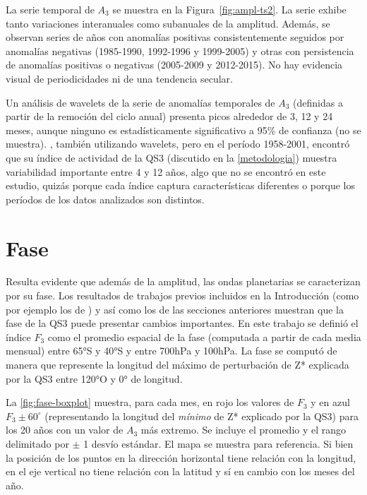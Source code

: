 \documentclass[spanish,a4paper,12pt,oneside]{book}
\begin{document}
La serie temporal de \(A_3\) se muestra en la Figura~\ref{fig:ampl-ts2}.
La serie exhibe tanto variaciones interanuales como subanuales de la
amplitud. Además, se observan series de años con anomalías positivas
consistentemente seguidos por anomalías negativas (1985-1990, 1992-1996
y 1999-2005) y otras con persistencia de anomalías positivas o negativas
(2005-2009 y 2012-2015). No hay evidencia visual de periodicidades ni de
una tendencia secular.

Un análisis de wavelets de la serie de anomalías temporales de \(A_3\)
(definidas a partir de la remoción del ciclo anual) presenta picos
alrededor de 3, 12 y 24 meses, aunque ninguno es estadísticamente
significativo a 95\% de confianza (no se muestra). \citet{Raphael2004},
también utilizando wavelets, pero en el período 1958-2001, encontró que
su índice de actividad de la QS3 (discutido en la \autoref{metodologia})
muestra variabilidad importante entre 4 y 12 años, algo que no se
encontró en este estudio, quizás porque cada índice captura
características diferentes o porque los períodos de los datos analizados
son distintos.

\section{Fase}\label{fase}

Resulta evidente que además de la amplitud, las ondas planetarias se
caracterizan por su fase. Los resultados de trabajos previos incluidos
en la Introducción (como por ejemplo los de \citet{Trenberth1985}) y así
como los de las secciones anteriores muestran que la fase de la QS3
puede presentar cambios importantes. En este trabajo se definió el
índice \(F_3\) como el promedio espacial de la fase (computada a partir
de cada media mensual) entre 65°S y 40°S y entre 700hPa y 100hPa. La
fase se computó de manera que represente la longitud del máximo de
perturbación de Z* explicada por la QS3 entre 120°O y 0° de longitud.

La \autoref{fig:fase-boxplot} muestra, para cada mes, en rojo los
valores de \(F_3\) y en azul \(F_3\pm 60^{\circ}\) (representando la
longitud del \emph{mínimo} de Z* explicado por la QS3) para los 20 años
con un valor de \(A_3\) más extremo. Se incluye el promedio y el rango
delimitado por \(\pm\) 1 desvío estándar. El mapa se muestra para
referencia. Si bien la posición de los puntos en la dirección horizontal
tiene relación con la longitud, en el eje vertical no tiene relación con
la latitud y sí en cambio con los meses del año.
\end{document}
